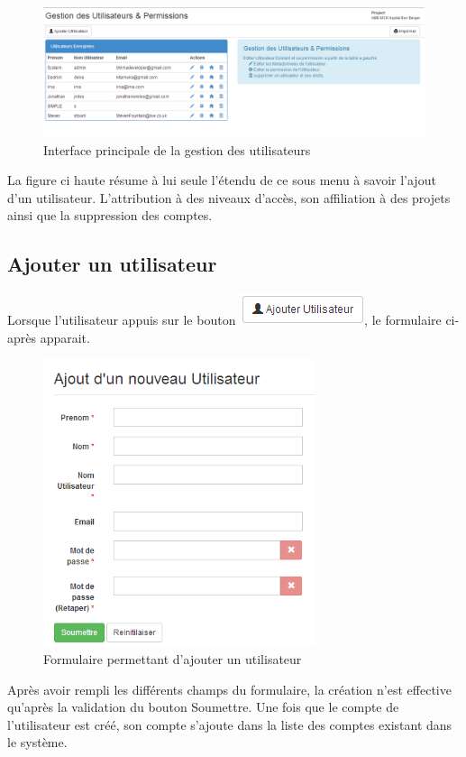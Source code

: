 \documentclass[12pt,a4paper]{report}
\begin{document}
\begin{figure}[h]
\begin{center}
\includegraphics[width=14cm]{pic/userAllow.png}
\end{center}
\caption{Interface principale de la gestion des utilisateurs}
\label{Interface principale de la gestion des utilisateurs}
\end{figure} 
La figure ci haute résume à lui seule l'étendu de ce sous menu à savoir l'ajout d'un utilisateur. L'attribution à des niveaux  d'accès, son affiliation à des projets ainsi que la suppression des comptes.

\subsection{Ajouter un utilisateur}
Lorsque l'utilisateur appuis sur le bouton \includegraphics[scale=1]{pic/AddUser.png}, le formulaire ci-après apparait.
\begin{figure}[h]
\begin{center}
\includegraphics[width=8cm]{pic/FormAddUser.png}
\end{center}
\caption{Formulaire permettant d'ajouter un utilisateur}
\label{Formulaire permettant d'ajouter un utilisateur}
\end{figure}
\newpage
Après avoir rempli les différents champs du formulaire, la création n'est effective qu'après la validation du bouton Soumettre.
Une fois que le compte de l'utilisateur est créé, son compte s'ajoute dans la liste des comptes existant dans le système.
\end{document}
